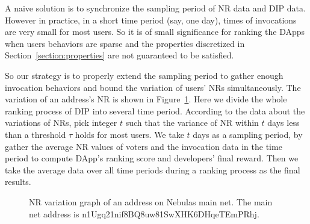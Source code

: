   A naive solution is to synchronize the sampling period of NR data and DIP data. However in practice, in a short time period (say, one day), times of invocations are very small for most users. So it is of small significance for ranking the DApps when users behaviors are sparse and the properties discretized  in Section~\ref{section:properties} are not guaranteed to be satisfied.

  So our strategy is to properly extend the sampling period to gather enough invocation behaviors and bound the variation of users' NRs simultaneously. The variation of  an address's NR is shown in Figure~\ref{fig:nr}. Here we divide the whole ranking process of DIP into several time period. According to the data about the variations of NRs, pick integer $t$ such that the variance of NR within $t$ days less than a threshold $\tau$ holds for most users. We take $t$ days as a sampling period, by gather the average NR values of voters and the invocation data in the time period to compute DApp's ranking score and developers' final reward. Then we take the average data over all time periods during a ranking process as the final  results.

  \begin{figure}
  	\label{fig:nr}
  	\centering
  	
  	\caption{NR variation graph of an address on Nebulas main net. The main net address is n1Ugq21nif8BQ8uw81SwXHK6DHqeTEmPRhj.}
  \end{figure}
